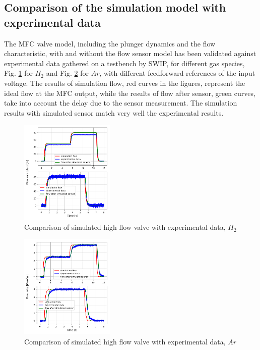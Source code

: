 \documentclass[letterpaper, 10pt, conference]{ieeeconf}
\begin{document}
\subsection{Comparison of the simulation model with experimental data}
The MFC valve model, including the plunger dynamics and the flow characteristic, with and without the flow sensor model has been validated against experimental data gathered on a testbench by SWIP, for different gas species, Fig. \ref{fig:mdl_H2} for $H_2$ and Fig. \ref{fig:mdl_Ar} for $Ar$, with different feedforward references of the input voltage. The results of simulation flow, red curves in the figures, represent the ideal flow at the MFC output, while the results of flow after sensor, green curves, take into account the delay due to the sensor measurement. The simulation results with simulated sensor match very well the experimental results. 

\begin{figure}[!ht]
    \centering
    \includegraphics[width=0.4\textwidth]{H2_model.pdf}
    \caption{Comparison of simulated high flow valve with experimental data, $H_2$}
    \label{fig:mdl_H2}
\end{figure}

\begin{figure}[!ht]
    \centering
    \includegraphics[width=0.4\textwidth]{Ar_model.pdf}
    \caption{Comparison of simulated high flow valve with experimental data, $Ar$}
    \label{fig:mdl_Ar}
\end{figure}
\end{document}

